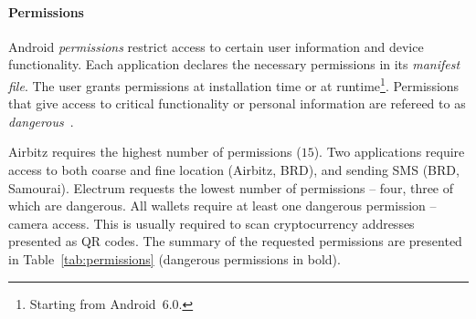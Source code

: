 \paragraph{Permissions}
Android \textit{permissions} restrict access to certain user information and device functionality.
Each application declares the necessary permissions in its \textit{manifest file}.
The user grants permissions at installation time or at runtime\footnote{Starting from Android~6.0.}.
Permissions that give access to critical functionality or personal information are refereed to as \textit{dangerous}~\cite{Android}.

Airbitz requires the highest number of permissions ($15$).
Two applications require access to both coarse and fine location (Airbitz, BRD), and sending SMS (BRD, Samourai).
Electrum requests the lowest number of permissions -- four, three of which are dangerous.
All wallets require at least one dangerous permission -- camera access.
This is usually required to scan cryptocurrency addresses presented as QR codes.
The summary of the requested permissions are presented in Table~\ref{tab:permissions} (dangerous permissions in bold).

